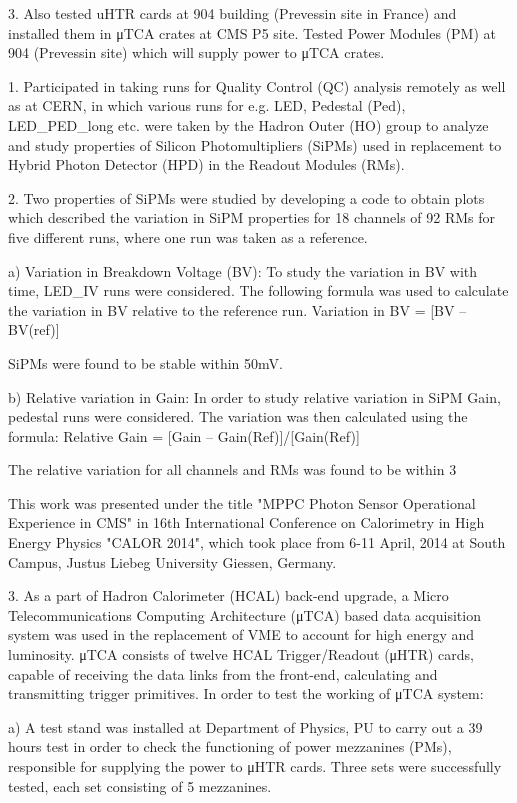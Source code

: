 3. Also tested uHTR cards at 904 building (Prevessin site in France) and installed them in μTCA crates at CMS P5 site. Tested Power Modules (PM) at 904 (Prevessin site) which will supply power to μTCA crates.

1. Participated in taking runs for Quality Control (QC) analysis remotely as well as at CERN, in which various runs for e.g. LED, Pedestal (Ped), LED_PED_long etc. were taken by the Hadron Outer (HO) group to analyze and study properties of Silicon Photomultipliers (SiPMs) used in replacement to Hybrid Photon Detector (HPD) in the Readout Modules (RMs).

2. Two properties of SiPMs were studied by developing a code to obtain plots which described the variation in SiPM properties for 18 channels of 92 RMs for five different runs, where one run was taken as a reference.

a) Variation in Breakdown Voltage (BV): To study the variation in BV with time, LED_IV runs were considered. The following formula was used to calculate the variation in BV relative to the reference run.
Variation in BV = [BV – BV(ref)]

SiPMs were found to be stable within 50mV.

b) Relative variation in Gain: In order to study relative variation in SiPM Gain, pedestal runs were considered. The variation was then calculated using the formula:
Relative Gain = [Gain – Gain(Ref)]/[Gain(Ref)]

The relative variation for all channels and RMs was found to be within 3%

This work was presented under the title "MPPC Photon Sensor Operational Experience in CMS" in 16th International Conference on Calorimetry in High Energy Physics "CALOR 2014", which took place from 6-11 April, 2014 at South Campus, Justus Liebeg University Giessen, Germany.

3. As a part of Hadron Calorimeter (HCAL) back-end upgrade, a Micro Telecommunications Computing Architecture (μTCA) based data acquisition system was used in the replacement of VME to account for high energy and luminosity. μTCA consists of twelve HCAL Trigger/Readout (μHTR) cards, capable of receiving the data links from the front-end, calculating and transmitting trigger primitives. In order to test the working of μTCA system:

a) A test stand was installed at Department of Physics, PU to carry out a 39 hours test in order to check the functioning of power mezzanines (PMs), responsible for supplying the power to μHTR cards. Three sets were successfully tested, each set consisting of 5 mezzanines.

